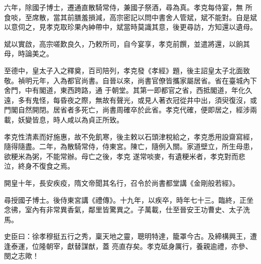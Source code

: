 \begin{pinyinscope}
 六年，除國子博士，遷通直散騎常侍，兼國子祭酒，尋為真。孝克每侍宴，無
 所食啖，至席散，當其前膳羞損減，高宗密記以問中書舍人管斌，斌不能對。自是斌以意伺之，見孝克取珍果內紳帶中，斌當時莫識其意，後更尋訪，方知還以遺母。



 斌以實啟，高宗嗟歎良久，乃敕所司，自今宴享，孝克前饌，並遣將還，以餉其母，時論美之。



 至德中，皇太子入之釋奠，百司陪列，孝克發《孝經》題，後主詔皇太子北面致敬。禎明元年，入為都官尚書。自晉以來，尚書官僚皆攜家屬居省。省在臺城內下舍門，中有閣道，東西跨路，通
 于朝堂。其第一即都官之省，西抵閣道，年化久遠，多有鬼怪，每昏夜之際，無故有聲光，或見人著衣冠從井中出，須臾復沒，或門閣自然開閉。居省者多死亡，尚書周確卒於此省。孝克代確，便即居之，經涉兩載，妖變皆息，時人咸以為貞正所致。



 孝克性清素而好施惠，故不免飢寒，後主敕以石頭津稅給之，孝克悉用設齋寫經，隨得隨盡。二年，為散騎常侍，侍東宮。陳亡，隨例入關。家道壁立，所生母患，欲粳米為粥，不能常辦。母亡之後，孝克
 遂常啖麥，有遺粳米者，孝克對而悲泣，終身不復食之焉。



 開皇十年，長安疾疫，隋文帝聞其名行，召令於尚書都堂講《金剛般若經》。



 尋授國子博士。後侍東宮講《禮傳》。十九年，以疾卒，時年七十三。臨終，正坐念彿，室內有非常異香氣，鄰里皆驚異之。子萬載，仕至晉安王功曹史、太子洗馬。



 史臣曰：徐孝穆挺五行之秀，稟天地之靈，聰明特達，籠罩今古。及締構興王，遭逢泰運，位隆朝宰，獻替謀猷，蓋
 亮直存矣。孝克砥身厲行，養親逾禮，亦參、閔之志歟！



\end{pinyinscope}